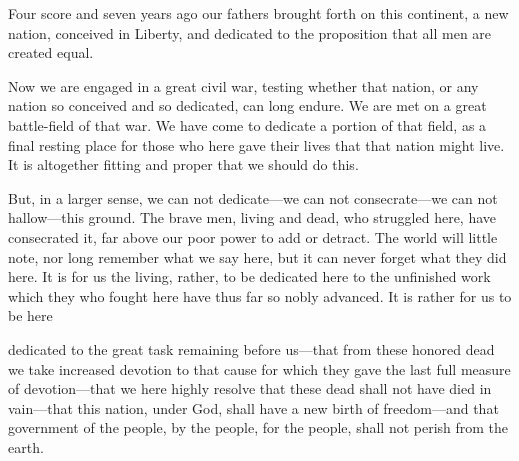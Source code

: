 \begin{abstracten}
    Four score and seven years ago our fathers brought forth on this continent, a new nation, conceived in Liberty, and dedicated to the proposition that all men are created equal.

    Now we are engaged in a great civil war, testing whether that nation, or any nation so conceived and so dedicated, can long endure. We are met on a great battle-field of that war. We have come to dedicate a portion of that field, as a final resting place for those who here gave their lives that that nation might live. It is altogether fitting and proper that we should do this.

    But, in a larger sense, we can not dedicate—we can not consecrate—we can not hallow—this ground. The brave men, living and dead, who struggled here, have consecrated it, far above our poor power to add or detract. The world will little note, nor long remember what we say here, but it can never forget what they did here. It is for us the living, rather, to be dedicated here to the unfinished work which they who fought here have thus far so nobly advanced. It is rather for us to be here

    dedicated to the great task remaining before us—that from these honored dead we take increased devotion to that cause for which they gave the last full measure of devotion—that we here highly resolve that these dead shall not have died in vain—that this nation, under God, shall have a new birth of freedom—and that government of the people, by the people, for the people, shall not perish from the earth.
\end{abstracten}
